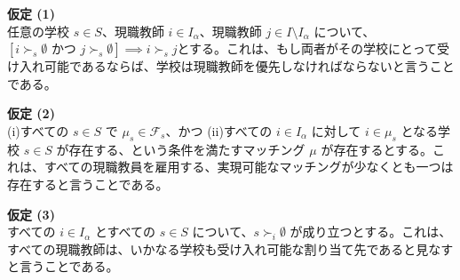 \documentclass[12pt, a4paper]{article}
\theoremstyle{definition}
\theoremstyle{remark}
\theoremstyle{plain}
\begin{document}


\vspace{0.5\baselineskip}
\noindent\textbf{仮定 (1)} \\
任意の学校 $s \in S$、現職教師 $i \in I_\alpha$、現職教師 $j \in I\setminus I_\alpha$ について、$[i \succ_s \emptyset \text{ かつ } j \succ_s \emptyset] \implies i \succ_s j$とする。これは、もし両者がその学校にとって受け入れ可能であるならば、学校は現職教師を優先しなければならないと言うことである。

\vspace{0.5\baselineskip}
\noindent\textbf{仮定 (2)} \\
(i)すべての $s \in S$ で $\mu_s \in \mathcal{F}_s$、かつ (ii)すべての $i \in I_\alpha$ に対して $i \in \mu_s$ となる学校 $s \in S$ が存在する、という条件を満たすマッチング $\mu$ が存在するとする。これは、すべての現職教員を雇用する、実現可能なマッチングが少なくとも一つは存在すると言うことである。

\vspace{0.5\baselineskip}
\noindent\textbf{仮定 (3)} \\
すべての $i \in I_\alpha$ とすべての $s \in S$ について、$s \succ_i \emptyset$ が成り立つとする。これは、すべての現職教師は、いかなる学校も受け入れ可能な割り当て先であると見なすと言うことである。




\end{document}
